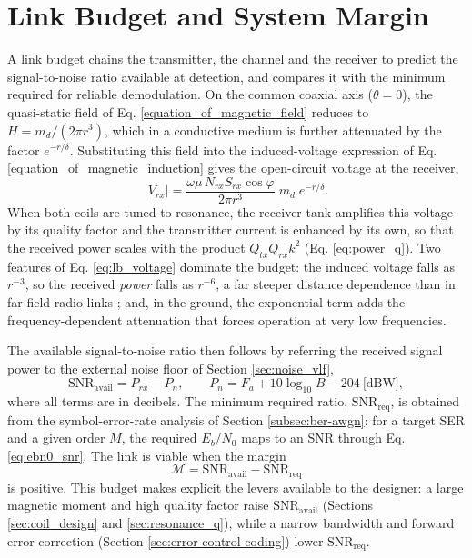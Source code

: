 \section{Link Budget and System Margin}
\label{sec:link_budget}

A link budget chains the transmitter, the channel and the receiver to predict the
signal-to-noise ratio available at detection, and compares it with the minimum
required for reliable demodulation.
On the common coaxial axis ($\theta = 0$), the quasi-static field of
Eq. \eqref{equation_of_magnetic_field} reduces to $H = m_d / (2\pi r^{3})$, which in a
conductive medium is further attenuated by the factor $e^{-r/\delta}$. Substituting this field into the induced-voltage
expression of Eq. \eqref{equation_of_magnetic_induction} gives the open-circuit voltage at the
receiver,
\begin{equation}
    |V_{rx}| = \frac{\omega\mu\,N_{rx} S_{rx}\cos\varphi}{2\pi r^{3}}\;m_d\;e^{-r/\delta}.
    \label{eq:lb_voltage}
\end{equation}
When both coils are tuned to resonance, the receiver tank amplifies this voltage
by its quality factor and the transmitter current is enhanced by its own, so that
the received power scales with the product $Q_{tx}Q_{rx}k^{2}$
(Eq. \eqref{eq:power_q}). Two features of Eq. \eqref{eq:lb_voltage} dominate the
budget: the induced voltage falls as $r^{-3}$, so the received \emph{power} falls
as $r^{-6}$, a far steeper distance dependence than in far-field radio
links \cite{agbinya2013, azad2012}; and, in the ground, the exponential term adds
the frequency-dependent attenuation that forces operation at very low frequencies.

The available signal-to-noise ratio then follows by referring the received signal
power to the external noise floor of Section \ref{sec:noise_vlf},
\begin{equation}
    \mathrm{SNR}_{\mathrm{avail}} = P_{rx} - P_n, \qquad
    P_n = F_a + 10\log_{10} B - 204 \ \text{[dBW]},
    \label{eq:lb_snr}
\end{equation}
where all terms are in decibels. The minimum required ratio,
$\mathrm{SNR}_{\mathrm{req}}$, is obtained from the symbol-error-rate analysis of
Section \ref{subsec:ber-awgn}: for a target SER and a given order $M$, the required
$E_b/N_0$ maps to an SNR through Eq. \ref{eq:ebn0_snr}. The link is viable when
the margin
\begin{equation}
    \mathcal{M} = \mathrm{SNR}_{\mathrm{avail}} - \mathrm{SNR}_{\mathrm{req}}
    \label{eq:lb_margin}
\end{equation}
is positive. This budget makes explicit the levers available to the designer: a
large magnetic moment and high quality factor raise $\mathrm{SNR}_{\mathrm{avail}}$
(Sections \ref{sec:coil_design} and \ref{sec:resonance_q}), while a narrow
bandwidth and forward error correction (Section \ref{sec:error-control-coding}) lower
$\mathrm{SNR}_{\mathrm{req}}$.

